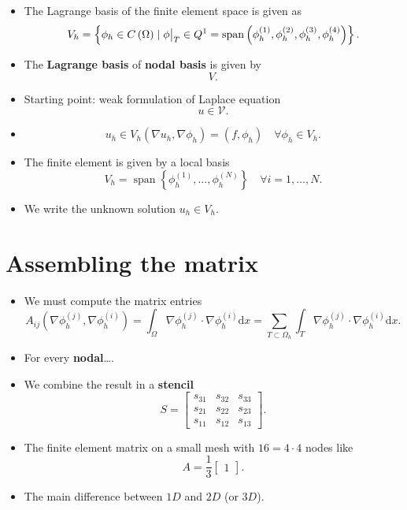 \documentclass[
	a4paper,
	11pt,
	oneside
]{scrreprt}
\theoremstyle{definition}
\newcommand\restr[2]{{%
		\left.\kern-\nulldelimiterspace %
		#1 %
		\vphantom{\big|} %
		\right|_{#2} %
}}
\begin{document}
\begin{itemize}
\item The Lagrange basis of the finite element space is given as \[ V_{h}=\left\{\phi_{h}\in C\left(\Omega\right)\mid\restr{\phi}{T}\in Q^{1}=\operatorname{span}\left(\phi^{(1)}_{h},\phi^{(2)}_{h},\phi^{(3)}_{h},\phi^{(4)}_{h}\right)\right\}. \]
\item The \textbf{Lagrange basis} of \textbf{nodal basis} is given by \[ V. \]
\end{itemize}

\begin{itemize}
	\item Starting point: weak formulation of Laplace equation \[ u\in\mathcal{V}. \]
	\item \[ u_{h}\in V_{h}\left(\nabla u_{h},\nabla\phi_{h}\right)=\left(f,\phi_{h}\right)\quad\forall\phi_{h}\in V_{h}. \]
	\item The finite element is given by a local basis \[V_{h}=\operatorname{span}\left\{\phi^{(1)}_{h},\ldots,\phi^{(N)}_{h}\right\}\quad\forall i=1,\ldots, N. \]
	\item We write the unknown solution $u_{h}\in V_{h}$.
\end{itemize}

\section{Assembling the matrix}

\begin{itemize}
	\item We must compute the matrix entries \[ A_{ij}\left(\nabla\phi_h^{(j)}, \nabla\phi_h^{(i)}\right)=\int_{\Omega}\nabla\phi_h^{(j)}\cdot\nabla\phi_h^{(i)}\mathrm{d}x=\sum_{T\subset\Omega_h}\int_{T}\nabla\phi_h^{(j)}\cdot\nabla\phi_h^{(i)}\mathrm{d}x. \]
	\item For every \textbf{nodal}\ldots.
\end{itemize}

\begin{itemize}
	\item We combine the result in a \textbf{stencil} \[ S=\begin{bmatrix}s_{31} & s_{32} & s_{33}\\s_{21} & s_{22} & s_{23}\\s_{11} & s_{12} & s_{13}\end{bmatrix}. \]
	\item The finite element matrix on a small mesh with $16=4\cdot4$ nodes like \[ A=\frac{1}{3}\begin{bmatrix}1\end{bmatrix}. \]
\end{itemize}

\begin{itemize}
	\item The main difference between $1D$ and $2D$ (or $3D$).
\end{itemize}
\end{document}

